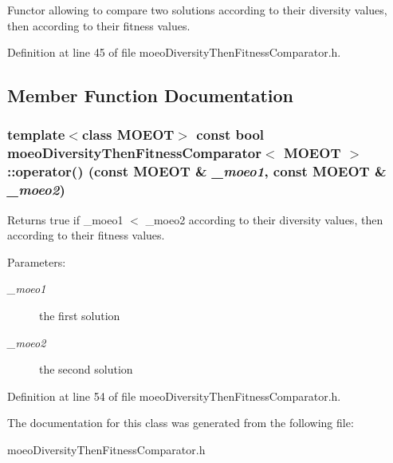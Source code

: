 Functor allowing to compare two solutions according to their diversity values, then according to their fitness values. 



Definition at line 45 of file moeo\-Diversity\-Then\-Fitness\-Comparator.h.

\subsection{Member Function Documentation}
\subsubsection{\setlength{\rightskip}{0pt plus 5cm}template$<$class MOEOT$>$ const bool \bf{moeo\-Diversity\-Then\-Fitness\-Comparator}$<$ MOEOT $>$::operator() (const MOEOT \& {\em \_\-moeo1}, const MOEOT \& {\em \_\-moeo2})\hspace{0.3cm}{\tt  [inline]}}\label{classmoeoDiversityThenFitnessComparator_62620887203d033af92091d838d4b0b6}


Returns true if \_\-moeo1 $<$ \_\-moeo2 according to their diversity values, then according to their fitness values. 

\begin{Desc}
\item[Parameters:]
\begin{description}
\item[{\em \_\-moeo1}]the first solution \item[{\em \_\-moeo2}]the second solution \end{description}
\end{Desc}


Definition at line 54 of file moeo\-Diversity\-Then\-Fitness\-Comparator.h.

The documentation for this class was generated from the following file:\begin{CompactItemize}
\item 
moeo\-Diversity\-Then\-Fitness\-Comparator.h\end{CompactItemize}
